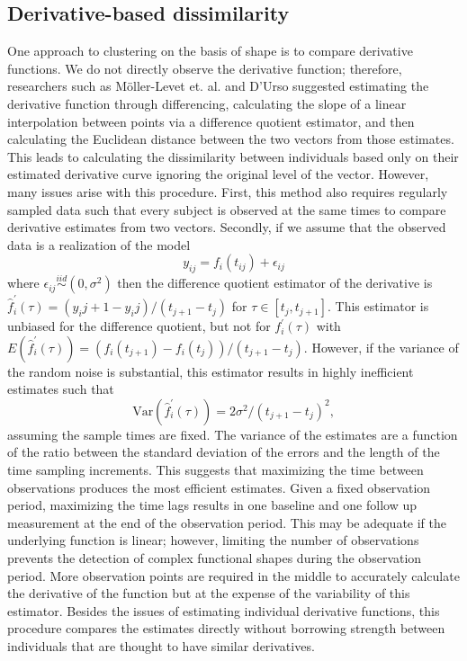 \subsection{Derivative-based dissimilarity}
One approach to clustering on the basis of shape is to compare derivative functions. We do not directly observe the derivative function; therefore, researchers such as M\"{o}ller-Levet et. al. \cite{moller2003} and D'Urso \cite{d2000} suggested estimating the derivative function through differencing, calculating the slope of a linear interpolation between points via a difference quotient estimator, and then calculating the Euclidean distance between the two vectors from those estimates. This leads to calculating the dissimilarity between individuals based only on their estimated derivative curve ignoring the original level of the vector. However, many issues arise with this procedure. First, this method also requires regularly sampled data such that every subject is observed at the same times to compare derivative estimates from two vectors. Secondly, if we assume that the observed data is a realization of the model
$$y_{ij}= f_i(t_{ij})+\epsilon_{ij}$$
where $\epsilon_{ij}\overset{iid}{\sim} (0,\sigma^{2})$ then the difference quotient estimator of the derivative is $\hat{f}_{i}^{'}(\tau) = (y_ij+1-y_ij)/(t_{j+1}-t_j)$ for $\tau\in[ t_{j}, t_{j+1}]$. This estimator is unbiased for the difference quotient, but not for $f_{i}^{'}(\tau)$ with $E(\hat{f}_{i}^{'}(\tau)) = (f_i(t_{j+1})-f_i(t_j))/(t_{j+1}-t_j)$. However, if the variance of the random noise is substantial, this estimator results in highly inefficient estimates such that
$$\text{Var}(\hat{f}_{i}^{'}(\tau)) =  2\sigma^{2}/ (t_{j+1}-t_j)^{2},$$
assuming the sample times are fixed. The variance of the estimates are a function of the ratio between the standard deviation of the errors and the length of the time sampling increments. This suggests that maximizing the time between observations produces the most efficient estimates. Given a fixed observation period, maximizing the time lags results in one baseline and one follow up measurement at the end of the observation period. This may be adequate if the underlying function is linear; however, limiting the number of observations prevents the detection of complex functional shapes during the observation period. More observation points are required in the middle to accurately calculate the derivative of the function but at the expense of the variability of this estimator. Besides the issues of estimating individual derivative functions, this procedure compares the estimates directly without borrowing strength between individuals that are thought to have similar derivatives.

